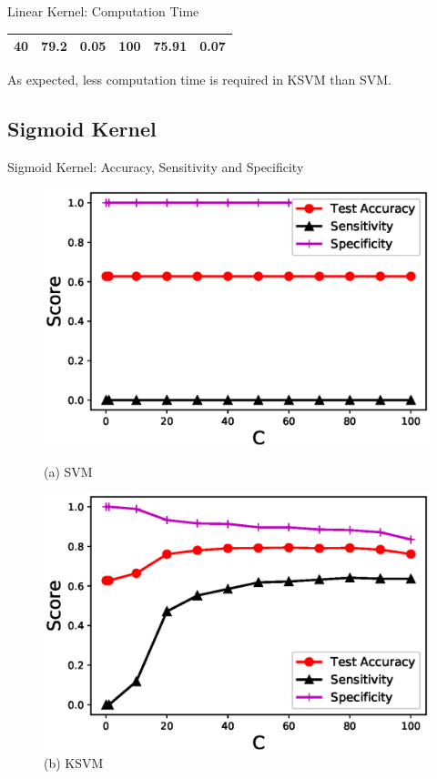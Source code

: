 \documentclass[xcolor=dvipsnames]{beamer}
\begin{document}
\begin{frame}{Linear Kernel: Computation Time}
\begin{table}[]
\begin{tabular}{|l|l|l||l|l|l|}
40  & 79.2                                                                     & 0.05                                                                     & 100 & 75.91                                                                   & 0.07                                                                    \\ \hline
\end{tabular}
\end{table}
As expected, less computation time  is required in KSVM than SVM.
\end{frame}

\subsection{Sigmoid Kernel}
\begin{frame}{Sigmoid Kernel: Accuracy, Sensitivity and Specificity}
\begin{figure}[H]
\begin{minipage}[t]{0.5\linewidth}
    \includegraphics[scale=0.43]{Figures/SVM_Sigmoid_Accuracy.eps}
    \caption*{(a) SVM}
\end{minipage}%
\begin{minipage}[t]{0.5\linewidth}
    \includegraphics[scale=0.43]{Figures/KSVM_Sigmoid_Accuracy.eps}
    \caption*{(b) KSVM}
\end{minipage} 
\end{figure}


\end{frame}
\end{document}
